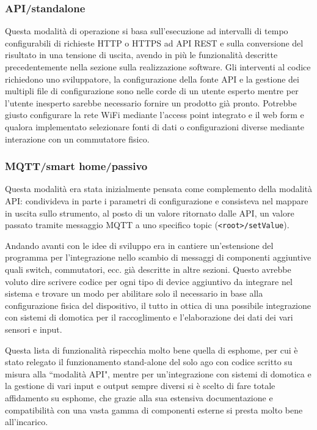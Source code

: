 \documentclass[12pt,a4paper]{report}
\begin{document}
\subsubsection{API/standalone}
Questa modalità di operazione si basa sull'esecuzione ad intervalli di tempo configurabili di richieste HTTP o HTTPS ad API REST
e sulla conversione del risultato in una tensione di uscita, avendo in più le funzionalità descritte precedentemente nella sezione
sulla realizzazione software.
Gli interventi al codice richiedono uno sviluppatore, la configurazione della fonte API e la gestione dei multipli file di configurazione sono nelle
corde di un utente esperto mentre per l'utente inesperto sarebbe necessario fornire un prodotto già pronto. Potrebbe giusto configurare
la rete WiFi mediante l'access point integrato e il web form e qualora implementato selezionare fonti di dati o configurazioni diverse mediante
interazione con un commutatore fisico.

\subsubsection{MQTT/smart home/passivo}
Questa modalità era stata inizialmente pensata come complemento della modalità API: condivideva in parte i parametri di configurazione
e consisteva nel mappare in uscita sullo strumento, al posto di un valore ritornato dalle API, un valore passato tramite messaggio MQTT
a uno specifico topic (\texttt{<root>/setValue}).

Andando avanti con le idee di sviluppo era in cantiere un'estensione del programma per l'integrazione nello scambio di messaggi di componenti
aggiuntive quali switch, commutatori, ecc. già descritte in altre sezioni. Questo avrebbe voluto dire scrivere codice per ogni tipo di device
aggiuntivo da integrare nel sistema e trovare un modo per abilitare solo il necessario in base alla configurazione fisica del dispositivo,
il tutto in ottica di una possibile integrazione con sistemi di domotica per il raccoglimento e l'elaborazione dei dati dei vari sensori e input.

Questa lista di funzionalità rispecchia molto bene quella di esphome, per cui è stato relegato il funzionamento stand-alone del solo ago
con codice scritto su misura alla ``modalità API", mentre per un'integrazione con sistemi di domotica e la gestione di vari input e output
sempre diversi si è scelto di fare totale affidamento su esphome, che grazie alla sua estensiva documentazione e compatibilità con una vasta
gamma di componenti esterne si presta molto bene all'incarico. \cite{esphomeio} 
\end{document}
